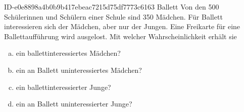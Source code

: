\begin{exercise}
      {ID-e0e8898a4b0b9b417ebeac7215d75df7773c6163}
      {Ballett}
  \ifproblem\problem
    Von den 500 Schülerinnen und Schülern einer Schule sind 350 Mädchen.
    Für Ballett interessieren sich  der Mädchen, aber nur 
    der Jungen. Eine Freikarte für eine Ballettaufführung wird ausgelost.
    Mit welcher Wahrscheinlichkeit erhält sie
    \begin{enumerate}[a)]
      \item ein ballettinteressiertes Mädchen?
      \item ein an Ballett uninteressiertes Mädchen?
      \item ein ballettinteressierter Junge?
      \item ein an Ballett uninteressierter Junge?
    \end{enumerate}
  \fi
\end{exercise}
